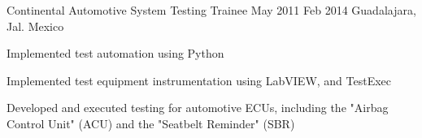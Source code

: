 \job
    {Continental Automotive}
    {System Testing Trainee}
    {May 2011}
    {Feb 2014}
    {Guadalajara, Jal. Mexico}
    {
        \begin{itemize-bullets}
            \item{Implemented test automation using Python}
            \item{Implemented test equipment instrumentation using LabVIEW, and TestExec}
            \item{Developed and executed testing for automotive ECUs, including the "Airbag Control Unit" (ACU) and the "Seatbelt Reminder" (SBR)}
        \end{itemize-bullets}
    }

